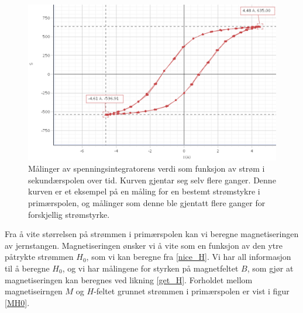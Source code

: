 \documentclass[%
 reprint,
 amsmath,amssymb,
 aps,
 norsk,
]{revtex4-1}
\begin{document}
\begin{figure}[h!]
  \centering
  \includegraphics[scale=0.255]{Hysterese.png}
  \caption{Målinger av spenningsintegratorens verdi som funksjon av strøm i sekundærspolen over tid. Kurven gjentar seg selv flere ganger. Denne kurven er et eksempel på en måling for en bestemt strømstykre i primærspolen, og målinger som denne ble gjentatt flere ganger for forskjellig strømstyrke.}
  \label{hysterese123}
\end{figure}
Fra å vite størrelsen på strømmen i primærspolen kan vi beregne magnetiseringen av jernstangen. Magnetiseringen ønsker vi å vite som en funksjon av den ytre påtrykte strømmen $H_0$, som vi kan beregne fra \eqref{nice_H}. Vi har all informasjon til å beregne $H_0$, og vi har målingene for styrken på magnetfeltet $B$, som gjør at magnetiseringen kan beregnes ved likning \eqref{get_H}. Forholdet mellom magnetiseirngen $M$ og $H$-feltet grunnet strømmen i primærspolen er vist i figur \vref{MH0}.
\end{document}
